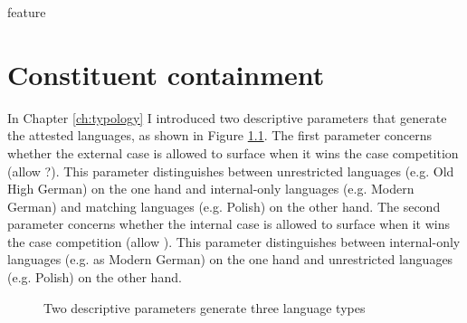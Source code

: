 feature%

\chapter{Constituent containment}\label{ch:relativization}

In Chapter \ref{ch:typology} I introduced two descriptive parameters that generate the attested languages, as shown in Figure \ref{fig:two-parameters}.
The first parameter concerns whether the external case is allowed to surface when it wins the case competition (allow ?). This parameter distinguishes between unrestricted languages (e.g. Old High German) on the one hand and internal-only languages (e.g. Modern German) and matching languages (e.g. Polish) on the other hand.
The second parameter concerns whether the internal case is allowed to surface when it wins the case competition (allow ). This parameter distinguishes between internal-only languages (e.g. as Modern German) on the one hand and unrestricted languages (e.g. Polish) on the other hand.

\begin{figure}[H]
  \centering
    \footnotesize{
    }
    \caption{Two descriptive parameters generate three language types}
    \label{fig:two-parameters}
\end{figure}


